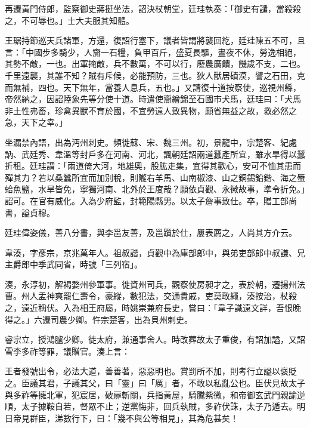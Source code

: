 \begin{pinyinscope}
 再遷黃門侍郎，監察御史蔣挺坐法，詔決杖朝堂，廷珪執奏：「御史有譴，當殺殺之，不可辱也。」士大夫服其知體。



 王琚持節巡天兵諸軍，方還，復詔行塞下，議者皆謂將襲回紇，廷珪陳五不可，且言：「中國步多騎少，人齎一石糧，負甲百斤，盛夏長驅，晝夜不休，勞逸相絕，其勢不敵，一也。出軍掩敵，兵不數萬，不可以行，廢農廣饋，饑歲不支，二也。千里遠襲，其誰不知？賊有斥候，必能預防，三也。狄人獸居磧漠，譬之石田，克而無補，四也。天下無年，當養人息兵，五也。」又請復十道按察使，巡視州縣，帝然納之，因詔陸象先等分使十道。時遣使齎繒錦至石國市犬馬，廷珪曰：「犬馬非土性弗畜，珍禽異獸不育於國，不宜勞遠人致異物，願省無益之故，救必然之急，天下之幸。」



 坐漏禁內語，出為沔州刺史。頻徙蘇、宋、魏三州。初，景龍中，宗楚客、紀處訥、武廷秀、韋溫等封戶多在河南、河北，諷朝廷詔兩道蠶產所宜，雖水旱得以蠶折租。廷珪謂：「兩道倚大河，地雄奧，股肱走集，宜得其歡心，安可不恤其患而殫其力？若以桑蠶所宜而加別稅，則隴右羊馬、山南椒漆、山之銅錫鉛鍇、海之蜃蛤魚鹽，水旱皆免，寧獨河南、北外於王度哉？願依貞觀、永徽故事，準令折免。」詔可。在官有威化。入為少府監，封範陽縣男。以太子詹事致仕。卒，贈工部尚書，謚貞穆。



 廷珪偉姿儀，善八分書，與李邕友善，及邕躓於仕，屢表薦之，人尚其方介云。



 韋湊，字彥宗，京兆萬年人。祖叔諧，貞觀中為庫部郎中，與弟吏部郎中叔謙、兄主爵郎中季武同省，時號「三列宿」。



 湊，永淳初，解褐婺州參軍事。徙資州司兵，觀察使房昶才之，表於朝，遷揚州法曹。州人盂神爽罷仁壽令，豪縱，數犯法，交通貴戚，吏莫敢繩，湊按治，杖殺之，遠近稱伏。入為相王府屬，時姚崇兼府長史，嘗曰：「韋子識遠文詳，吾恨晚得之。」六遷司農少卿。忤宗楚客，出為貝州刺史。



 睿宗立，授鴻臚少卿。徙太府，兼通事舍人。時改葬故太子重俊，有詔加謚，又詔雪李多祚等罪，議贈官。湊上言：



 王者發號出令，必法大道，善善著，惡惡明也。賞罰所不加，則考行立謚以褒貶之。臣議其君，子議其父，曰「靈」曰「厲」者，不敢以私亂公也。臣伏見故太子與多祚等擁北軍，犯宸居，破扉斬關，兵指黃屋，騎騰紫微，和帝御玄武門親諭逆順，太子據鞍自若，督眾不止；逆黨悔非，回兵執賊，多祚伏誅，太子乃遁去。明日帝見群臣，涕數行下，曰：「幾不與公等相見」，其為危甚矣！




\end{pinyinscope}
